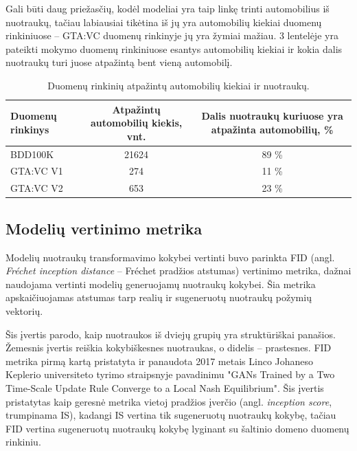\documentclass{VUMIFPSkursinis}
\begin{document}
            Gali būti daug priežasčių, kodėl modeliai yra taip linkę trinti automobilius iš nuotraukų, tačiau labiausiai tikėtina iš jų yra automobilių kiekiai duomenų rinkiniuose – GTA:VC duomenų rinkinyje jų yra žymiai mažiau. 3 lentelėje yra pateikti mokymo duomenų rinkiniuose esantys automobilių kiekiai ir kokia dalis nuotraukų turi juose atpažintą bent vieną automobilį.
            \begin{table}[H]
                \footnotesize
                \centering
                \caption{Duomenų rinkinių atpažintų automobilių kiekiai ir nuotraukų.}
                {\begin{tabular}{|l|c|c|} \hline
                    Duomenų rinkinys & Atpažintų automobilių kiekis, vnt. & Dalis nuotraukų kuriuose yra atpažinta automobilių, \%\\
                    \hline
                    BDD100K & 21624 & 89 \%\\
                    GTA:VC V1 & 274 & 11 \%\\
                    GTA:VC V2 & 653 & 23 \%\\
                    \hline
                    \end{tabular}
                }
                \label{tab:table example}
            \end{table}

        \subsection*{Modelių vertinimo metrika}
            Modelių nuotraukų transformavimo kokybei vertinti buvo parinkta FID (angl. \emph{Fréchet inception distance} – Fréchet pradžios atstumas) vertinimo metrika, dažnai naudojama vertinti modelių generuojamų nuotraukų kokybei\cite{FidArt}. Šia metrika apskaičiuojamas atstumas tarp realių ir sugeneruotų nuotraukų požymių vektorių.

            Šis įvertis parodo, kaip nuotraukos iš dviejų grupių yra struktūriškai panašios. Žemesnis įvertis reiškia kokybiškesnes nuotraukas, o didelis – prastesnes. FID metrika pirmą kartą pristatyta ir panaudota 2017 metais Linco Johaneso Keplerio universiteto tyrimo straipsnyje pavadinimu "GANs Trained by a Two Time-Scale Update Rule Converge to a Local Nash Equilibrium"\cite{FidStart}. Šis įvertis pristatytas kaip geresnė metrika vietoj pradžios įverčio (angl. \emph{inception score}, trumpinama IS), kadangi IS vertina tik sugeneruotų nuotraukų kokybę, tačiau FID vertina sugeneruotų nuotraukų kokybę lyginant su šaltinio domeno duomenų rinkiniu.
        
\end{document}

